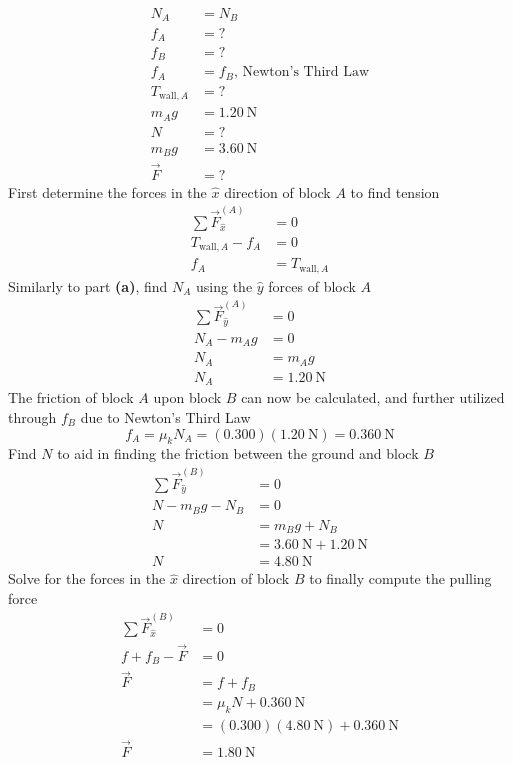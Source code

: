 \documentclass{article}
\begin{document}
\begin{enumerate}[label=\textbf{(\alph*)}]
\begin{align*}
			N_A & = N_B \\
			f_A & = ? \\
			f_B & = ? \\
			f_A & = f_B \text{, Newton's Third Law} \\
			T_{\text{wall},A} & = ? \\
			m_Ag & = \SI{1.20}{\newton} \\
			N & = ? \\
			m_Bg & = \SI{3.60}{\newton} \\
			\vec{F} & = ?
		\end{align*}
		First determine the forces in the $ \hat{x} $ direction of block $ A $ to find tension
		\begin{align*}
			\sum \vec{F}_{\hat{x}}^{(A)} & = 0 \\
			T_{\text{wall},A} - f_A & = 0 \\
			f_A & = T_{\text{wall},A}
		\end{align*}
		Similarly to part \textbf{(a)}, find $ N_A $ using the $ \hat{y} $ forces of block $ A $
		\begin{align*}
			\sum \vec{F}_{\hat{y}}^{(A)} & = 0 \\
			N_A - m_Ag & = 0 \\
			N_A & = m_Ag \\
			N_A & = \SI{1.20}{\newton}
		\end{align*}
		The friction of block $ A $ upon block $ B $ can now be calculated, and further utilized through $ f_B $ due to Newton's Third Law
		$$ f_A = \mu_k N_A = (0.300)(\SI{1.20}{\newton}) = \SI{0.360}{\newton} $$
		Find $ N $ to aid in finding the friction between the ground and block $ B $
		\begin{align*}
			\sum \vec{F}_{\hat{y}}^{(B)} & = 0 \\
			N - m_Bg - N_B & = 0 \\
			N & = m_Bg + N_B \\
			  & = \SI{3.60}{\newton} + \SI{1.20}{\newton} \\
			N & = \SI{4.80}{\newton}
		\end{align*}
		Solve for the forces in the $ \hat{x} $ direction of block $ B $ to finally compute the pulling force
		\begin{align*}
			\sum \vec{F}_{\hat{x}}^{(B)} & = 0 \\
			f + f_B - \vec{F} & = 0 \\
			\vec{F} & = f + f_B \\
					& = \mu_k N + \SI{0.360}{\newton} \\
					& = (0.300)(\SI{4.80}{\newton}) + \SI{0.360}{\newton} \\
			\vec{F} & = \SI{1.80}{\newton}
		\end{align*}
\end{enumerate}
\end{document}
